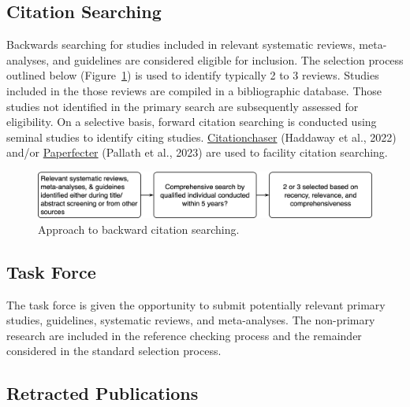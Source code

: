 \documentclass[
  letterpaper,
  DIV=11,
  numbers=noendperiod]{scrreprt}
\begin{document}
\hypertarget{citation-searching}{%
\subsection{Citation Searching}\label{citation-searching}}

Backwards searching for studies included in relevant systematic reviews,
meta-analyses, and guidelines are considered eligible for inclusion. The
selection process outlined below (Figure~\ref{fig-checking}) is used to
identify typically 2 to 3 reviews. Studies included in the those reviews
are compiled in a bibliographic database. Those studies not identified
in the primary search are subsequently assessed for eligibility. On a
selective basis, forward citation searching is conducted using seminal
studies to identify citing studies.
\href{https://estech.shinyapps.io/citationchaser/}{Citationchaser}
(Haddaway et al., 2022) and/or
\href{https://paperfetcher-paperfetcher-web-app-paperfetcher-app-0w0vu2.streamlit.app/}{Paperfecter}
(Pallath et al., 2023) are used to facility citation searching.

\begin{figure}

\caption{\label{fig-checking}Approach to backward citation searching.}

\includegraphics[width=5.20833in,height=\textheight]{assets/referenceChecking.png} \hfill{}

\end{figure}

\hypertarget{task-force}{%
\subsection{Task Force}\label{task-force}}

The task force is given the opportunity to submit potentially relevant
primary studies, guidelines, systematic reviews, and meta-analyses. The
non-primary research are included in the reference checking process and
the remainder considered in the standard selection process.

\hypertarget{retracted-publications}{%
\subsection{Retracted Publications}\label{retracted-publications}}
\end{document}
